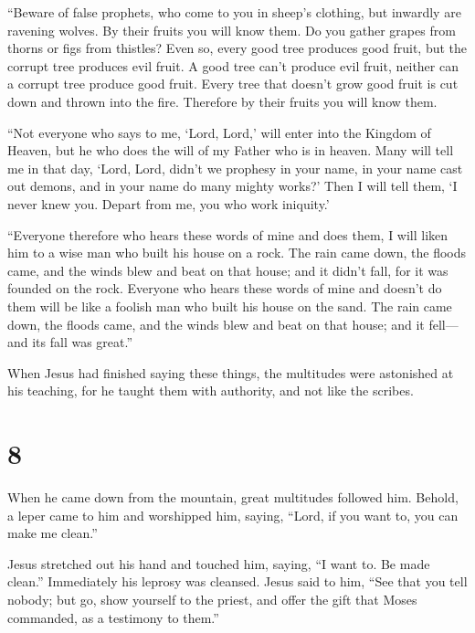  ``Beware of false prophets, who come to you in sheep's
clothing, but inwardly are ravening wolves.  By their
fruits you will know them. Do you gather grapes from thorns or figs from
thistles?  Even so, every good tree produces good fruit,
but the corrupt tree produces evil fruit.  A good tree
can't produce evil fruit, neither can a corrupt tree produce good fruit.
 Every tree that doesn't grow good fruit is cut down and
thrown into the fire.  Therefore by their fruits you will
know them.

 ``Not everyone who says to me, `Lord, Lord,' will enter
into the Kingdom of Heaven, but he who does the will of my Father who is
in heaven.  Many will tell me in that day, `Lord, Lord,
didn't we prophesy in your name, in your name cast out demons, and in
your name do many mighty works?'  Then I will tell them, `I
never knew you. Depart from me, you who work iniquity.'

 ``Everyone therefore who hears these words of mine and
does them, I will liken him to a wise man who built his house on a rock.
 The rain came down, the floods came, and the winds blew
and beat on that house; and it didn't fall, for it was founded on the
rock.  Everyone who hears these words of mine and doesn't
do them will be like a foolish man who built his house on the sand.
 The rain came down, the floods came, and the winds blew
and beat on that house; and it fell---and its fall was great.''

 When Jesus had finished saying these things, the
multitudes were astonished at his teaching,  for he taught
them with authority, and not like the scribes.

\hypertarget{section-7}{%
\section{8}\label{section-7}}

 When he came down from the mountain, great multitudes
followed him.  Behold, a leper came to him and worshipped
him, saying, ``Lord, if you want to, you can make me clean.''

 Jesus stretched out his hand and touched him, saying, ``I
want to. Be made clean.'' Immediately his leprosy was cleansed.
 Jesus said to him, ``See that you tell nobody; but go, show
yourself to the priest, and offer the gift that Moses commanded, as a
testimony to them.''

